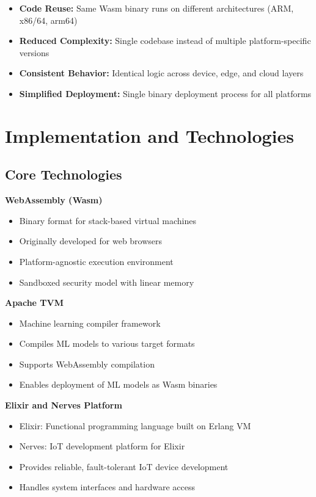 \documentclass[11pt]{article}
\begin{document}
\begin{itemize}
\item \textbf{Code Reuse:} Same Wasm binary runs on different architectures (ARM, x86/64, arm64)
\item \textbf{Reduced Complexity:} Single codebase instead of multiple platform-specific versions
\item \textbf{Consistent Behavior:} Identical logic across device, edge, and cloud layers
\item \textbf{Simplified Deployment:} Single binary deployment process for all platforms
\end{itemize}

\section{Implementation and Technologies}

\subsection{Core Technologies}

\textbf{WebAssembly (Wasm)} \cite{webassembly2023}
\begin{itemize}
\item Binary format for stack-based virtual machines
\item Originally developed for web browsers
\item Platform-agnostic execution environment
\item Sandboxed security model with linear memory
\end{itemize}

\textbf{Apache TVM} \cite{apachetvm2023}
\begin{itemize}
\item Machine learning compiler framework
\item Compiles ML models to various target formats
\item Supports WebAssembly compilation
\item Enables deployment of ML models as Wasm binaries
\end{itemize}

\textbf{Elixir and Nerves Platform} \cite{nerves2023}
\begin{itemize}
\item Elixir: Functional programming language built on Erlang VM
\item Nerves: IoT development platform for Elixir
\item Provides reliable, fault-tolerant IoT device development
\item Handles system interfaces and hardware access
\end{itemize}
\end{document}
